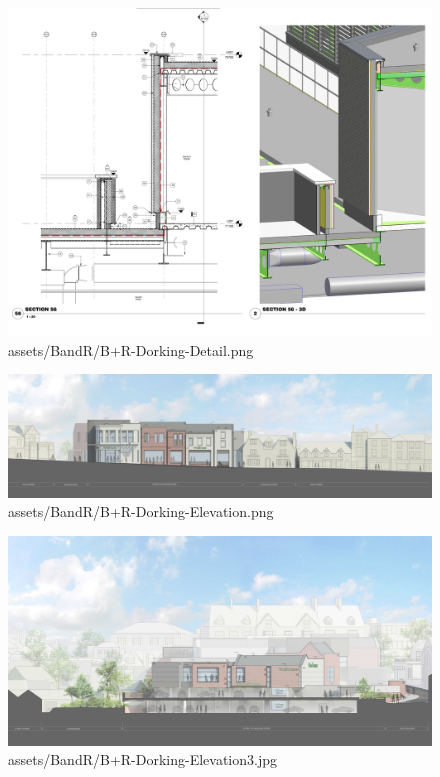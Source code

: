 \documentclass[
]{article}
\begin{document}
\begin{figure}[H]

{\centering \includegraphics{assets/BandR/B+R-Dorking-Detail.png}

}

\caption{assets/BandR/B+R-Dorking-Detail.png}

\end{figure}%
\begin{figure}[H]

{\centering \includegraphics{assets/BandR/B+R-Dorking-Elevation.png}

}

\caption{assets/BandR/B+R-Dorking-Elevation.png}

\end{figure}%
\begin{figure}[H]

{\centering \includegraphics{assets/BandR/B+R-Dorking-Elevation3.jpg}

}

\caption{assets/BandR/B+R-Dorking-Elevation3.jpg}

\end{figure}%
\end{document}
